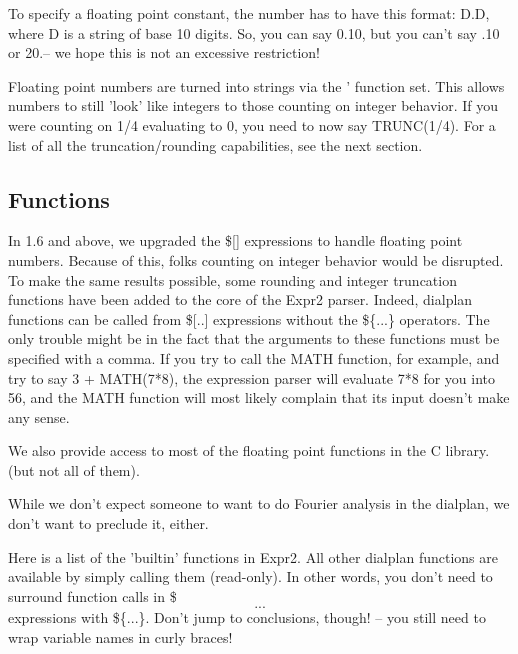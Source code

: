 To specify a floating point constant, the number has to have this format: D.D, where D is 
a string of base 10 digits. So, you can say 0.10, but you can't say .10 or 20.-- we hope
this is not an excessive restriction!

Floating point numbers are turned into strings via the '%
function set. This allows numbers to still 'look' like integers to those counting
on integer behavior. If you were counting on 1/4 evaluating to 0, you need to now say
TRUNC(1/4). For a list of all the truncation/rounding capabilities, see the next section.


\subsection{Functions}

In 1.6 and above, we upgraded the \$[] expressions to handle floating point numbers.
Because of this, folks counting on integer behavior would be disrupted. To make
the same results possible, some rounding and integer truncation functions have been
added to the core of the Expr2 parser. Indeed, dialplan functions can be called from
\$[..] expressions without the \$\{...\} operators. The only trouble might be in the fact that
the arguments to these functions must be specified with a comma. If you try to call
the MATH function, for example, and try to say 3 + MATH(7*8), the expression parser will
evaluate 7*8 for you into 56, and the MATH function will most likely complain that its 
input doesn't make any sense.

We also provide access to most of the floating point functions in the C library. (but not all of them).

While we don't expect someone to want to do Fourier analysis in the dialplan, we
don't want to preclude it, either.

Here is a list of the 'builtin' functions in Expr2. All other dialplan functions
are available by simply calling them (read-only). In other words, you don't need to
surround function calls in \$\[...\] expressions with \$\{...\}. Don't jump to conclusions,
though! -- you still need to wrap variable names in curly braces!

